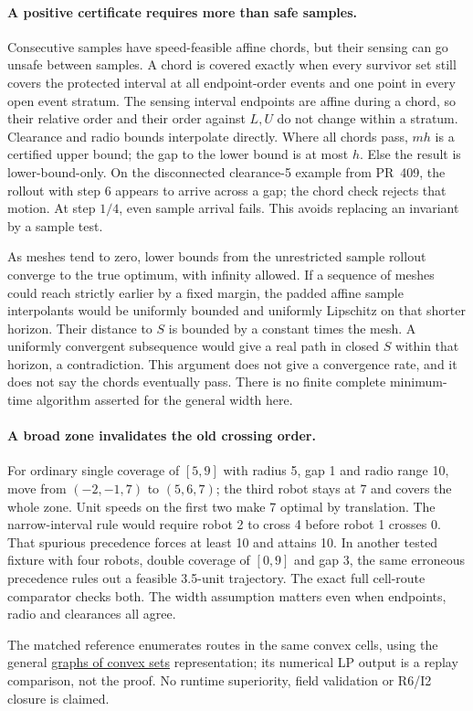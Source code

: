 \documentclass{article}
\begin{document}
\paragraph{A positive certificate requires more than safe samples.}
Consecutive samples have speed-feasible affine chords, but their
sensing can go unsafe between samples. A chord is covered exactly
when every survivor set still covers the protected interval at all
endpoint-order events and one point in every open event stratum.
The sensing interval endpoints are affine during a chord, so their
relative order and their order against $L,U$ do not change within
a stratum. Clearance and radio bounds interpolate directly. Where
all chords pass, $mh$ is a certified upper bound; the gap to the
lower bound is at most $h$. Else the result is lower-bound-only.
On the disconnected clearance-5 example from PR~409, the rollout
with step 6 appears to arrive across a gap; the chord check rejects
that motion. At step $1/4$, even sample arrival fails. This avoids
replacing an invariant by a sample test.

As meshes tend to zero, lower bounds from the unrestricted
sample rollout converge to the true optimum, with infinity allowed.
If a sequence of meshes could reach strictly earlier by a fixed
margin, the padded affine sample interpolants would be uniformly
bounded and uniformly Lipschitz on that shorter horizon. Their
distance to $S$ is bounded by a constant times the mesh. A uniformly
convergent subsequence would give a real path in closed $S$ within
that horizon, a contradiction. This argument does not give a
convergence rate, and it does not say the chords eventually pass.
There is no finite complete minimum-time algorithm asserted for
the general width here.

\paragraph{A broad zone invalidates the old crossing order.}
For ordinary single coverage of $[5,9]$ with radius 5, gap 1 and
radio range 10, move from $(-2,-1,7)$ to $(5,6,7)$; the third
robot stays at 7 and covers the whole zone. Unit speeds on the
first two make 7 optimal by translation. The narrow-interval rule
would require robot 2 to cross 4 before robot 1 crosses 0.
That spurious precedence forces at least 10 and attains 10.
In another tested fixture with four robots, double coverage of
$[0,9]$ and gap 3, the same erroneous precedence rules out a
feasible 3.5-unit trajectory. The exact full cell-route comparator
checks both. The width assumption matters even when endpoints,
radio and clearances all agree.

The matched reference enumerates routes in the same convex cells,
using the general \href{https://arxiv.org/abs/2205.04422}{graphs of
convex sets} representation; its numerical LP output is a replay
comparison, not the proof. No runtime superiority, field validation
or R6/I2 closure is claimed.
\end{document}
